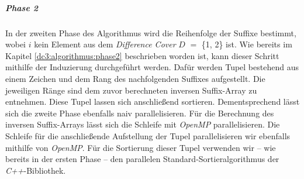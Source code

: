 \subparagraph*{Phase 2}
In der zweiten Phase des Algorithmus wird die Reihenfolge der Suffixe  bestimmt, wobei $i$ kein Element aus dem \emph{Difference Cover} \(D\) $=$ \{1, 2\} ist. Wie bereits im Kapitel \ref{dc3:algorithmus:phase2} beschrieben worden ist, kann dieser Schritt mithilfe der Induzierung durchgeführt werden. Dafür werden Tupel bestehend aus einem Zeichen  und dem Rang des nachfolgenden Suffixes  aufgestellt. Die jeweiligen Ränge sind dem zuvor berechneten inversen Suffix-Array zu entnehmen. Diese Tupel lassen sich anschließend sortieren.
Dementsprechend lässt sich die zweite Phase ebenfalls naiv parallelisieren. Für die Berechnung des inversen Suffix-Arrays lässt sich die Schleife mit \emph{OpenMP} parallelisieren. Die Schleife für die anschließende Aufstellung der Tupel parallelisieren wir ebenfalls mithilfe von \emph{OpenMP}. Für die Sortierung dieser Tupel verwenden wir -- wie bereits in der ersten Phase -- den parallelen Standard-Sortieralgorithmus der \emph{C++}-Bibliothek.
